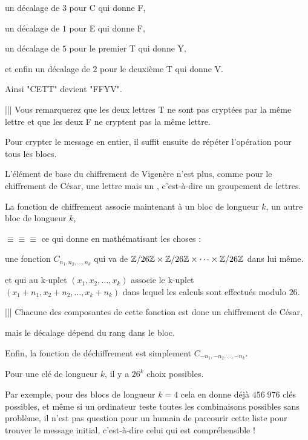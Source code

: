   \change
  un décalage de $3$ pour C qui donne F,
  
  \change
  un décalage de $1$ pour E qui donne F,
  
  \change
  un décalage de $5$ pour le premier T qui donne Y,
  
  \change
  et enfin un décalage de $2$ pour le deuxième T qui donne V. 

\change

Ainsi "CETT" devient "FFYV".

||| Vous remarquerez que les deux lettres T ne sont pas cryptées par la même lettre
et que les deux F ne cryptent pas la même lettre. 

Pour crypter le message en entier, il suffit ensuite de répéter l'opération pour tous les blocs.


\diapo


L'élément de base du chiffrement de Vigenère n'est plus, comme pour le chiffrement de César, une lettre mais un , 
c'est-à-dire un groupement de lettres.

La fonction de chiffrement associe maintenant à un bloc de lon\-gueur $k$, un autre bloc de longueur $k$, 

\change

$\equiv \equiv \equiv $ 
ce qui donne en mathématisant les choses :

une fonction $C_{n_1,n_2,\ldots,n_k}$ qui va de
$\mathbb{Z}/26\mathbb{Z} \times \mathbb{Z}/26\mathbb{Z} \times \cdots \times \mathbb{Z}/26\mathbb{Z}$ dans lui même.

et qui au k-uplet $(x_1,x_2,\ldots,x_k)$ associe le k-uplet $(x_1+n_1,x_2+n_2,\ldots,x_k+n_k)$
dans lequel les calculs sont effectués modulo $26$.

\change

||| Chacune des composantes de cette fonction est donc un chiffrement de César,

mais le décalage dépend du rang dans le bloc.

\change

Enfin, la fonction de déchiffrement est simplement $C_{-n_1,-n_2,\ldots,-n_k}$.


\diapo

\change

Pour une clé de longueur $k$, il y a $26^k$ choix possibles.

\change


Par exemple, pour des blocs de longueur $k=4$ cela en donne déjà $456\;976$ clés possibles, et même si un ordinateur teste
toutes les combinaisons possibles sans problème, il n'est pas question pour un humain de parcourir 
cette liste pour trouver le message initial, c'est-à-dire celui qui est compréhensible !

